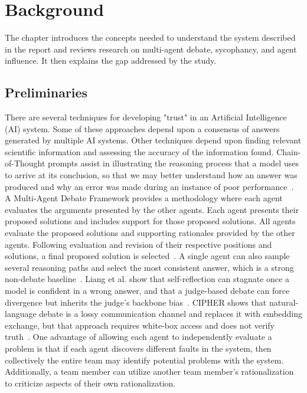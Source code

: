 \chapter{Background}\label{chapter:background}

The chapter introduces the concepts needed to understand the system described in
the report and reviews research on multi-agent debate, sycophancy, and agent
influence. It then explains the gap addressed by the study.


\section{Preliminaries}\label{sec:preliminaries}
There are several techniques for developing "trust" in an Artificial Intelligence (AI) system. Some of these approaches depend upon a consensus of answers generated by multiple AI systems. Other techniques depend upon finding relevant scientific information and assessing the accuracy of the information found.
Chain-of-Thought prompts assist in illustrating the reasoning process that a model uses to arrive at its conclusion, so that we may better understand how an answer was produced and why an error was made during an instance of poor performance~\cite{wei2022chain,zhang2025from}. A Multi-Agent Debate Framework provides a methodology where each agent evaluates the arguments presented by the other agents. Each agent presents their proposed solutions and includes support for those proposed solutions. All agents evaluate the proposed solutions and supporting rationales provided by the other agents. Following evaluation and revision of their respective positions and solutions, a final proposed solution is selected~\cite{du2024improving}. A single agent can also sample several reasoning paths and select the most consistent answer, which is a strong non-debate baseline~\cite{wang2023selfconsistency}. Liang et al. show that self-reflection can stagnate once a model is confident in a wrong answer, and that a judge-based debate can force divergence but inherits the judge's backbone bias~\cite{liang2024divergent}. CIPHER shows that natural-language debate is a lossy communication channel and replaces it with embedding exchange, but that approach requires white-box access and does not verify truth~\cite{pham2024cipher}. One advantage of allowing each agent to independently evaluate a problem is that if each agent discovers different faults in the system, then collectively the entire team may identify potential problems with the system. Additionally, a team member can utilize another team member's rationalization to criticize aspects of their own rationalization.
